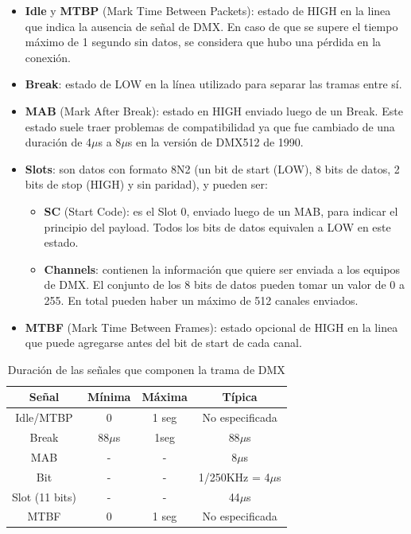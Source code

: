 \begin{itemize}
	\item \textbf{Idle} y \textbf{MTBP} (Mark Time Between Packets): estado de HIGH en la linea que indica la ausencia de señal de DMX. En caso de que se supere el tiempo máximo de 1 segundo sin datos, se considera que hubo una pérdida en la conexión.
	\item \textbf{Break}: estado de LOW en la línea utilizado para separar las tramas entre sí.
	\item \textbf{MAB} (Mark After Break): estado en HIGH enviado luego de un Break. Este estado suele traer problemas de compatibilidad ya que fue cambiado de una duración de 4\(\mu \)s a 8\(\mu \)s en la versión de DMX512 de 1990.
	\item \textbf{Slots}: son datos con formato 8N2 (un bit de start (LOW), 8 bits de datos, 2 bits de stop (HIGH) y sin paridad), y pueden ser:
	\begin{itemize}
		\item \textbf{SC} (Start Code): es el Slot 0, enviado luego de un MAB, para indicar el principio del payload. Todos los bits de datos equivalen a LOW en este estado.
		\item \textbf{Channels}: contienen la información que quiere ser enviada a los equipos de DMX. El conjunto de los 8 bits de datos pueden tomar un valor de 0 a 255. En total pueden haber un máximo de 512 canales enviados.
	\end{itemize}
	\item \textbf{MTBF} (Mark Time Between Frames): estado opcional de HIGH en la linea que puede agregarse antes del bit de start de cada canal.
\end{itemize}


\begin{table}[!ht]
	\begin{center}
		\begin{tabular}{|c|c|c|c|}
			\hline
			\rowcolor{OODlightblue}
			\textbf{Señal} & \textbf{Mínima} & \textbf{Máxima} & \textbf{Típica} \\
			\hline \hline
			Idle/MTBP & 0 & 1 seg & No especificada \\
			Break & 88\(\mu \)s & 1seg & 88\(\mu \)s\\
			MAB & - & - & 8\(\mu \)s \\
			Bit & - & - & 1/250KHz = 4\(\mu \)s \\
			Slot (11 bits) & - & - & 44\(\mu \)s \\
			MTBF & 0 & 1 seg & No especificada \\
			\hline
		\end{tabular}
	\end{center}
	\caption{Duración de las señales que componen la trama de DMX}
	\label{table:\thetable}
\end{table}

